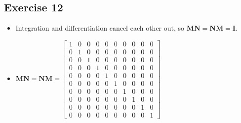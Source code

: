 \documentclass[11pt]{article}
\begin{document}
\subsection{Exercise 12}

\begin{itemize}
	\item Integration and differentiation cancel each other out, so $\textbf{M}\textbf{N}=\textbf{N}\textbf{M}=\textbf{I}$.
	\item $\textbf{M}\textbf{N}=\textbf{N}\textbf{M}=\begin{bmatrix}
	1 & 0 & 0 & 0 & 0 & 0 & 0 & 0 & 0 & 0 \\
	0 & 1 & 0 & 0 & 0 & 0 & 0 & 0 & 0 & 0 \\
	0 & 0 & 1 & 0 & 0 & 0 & 0 & 0 & 0 & 0 \\
	0 & 0 & 0 & 1 & 0 & 0 & 0 & 0 & 0 & 0 \\
	0 & 0 & 0 & 0 & 1 & 0 & 0 & 0 & 0 & 0 \\
	0 & 0 & 0 & 0 & 0 & 1 & 0 & 0 & 0 & 0 \\
	0 & 0 & 0 & 0 & 0 & 0 & 1 & 0 & 0 & 0 \\
	0 & 0 & 0 & 0 & 0 & 0 & 0 & 1 & 0 & 0 \\
	0 & 0 & 0 & 0 & 0 & 0 & 0 & 0 & 1 & 0\\
	0 & 0 & 0 & 0 & 0 & 0 & 0 & 0 & 0 & 1
\end{bmatrix}$
\end{itemize}
\end{document}
